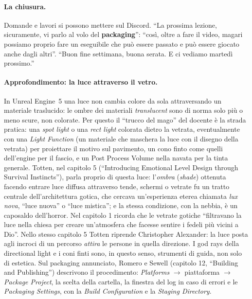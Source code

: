 \paragraph{La chiusura.} Domande e lavori si possono mettere sul Discord. ``La prossima lezione,
sicuramente, vi parlo al volo del \textbf{packaging}'': ``così, oltre a fare il video, magari
possiamo proprio fare un eseguibile che può essere passato e può essere giocato anche dagli
altri''. ``Buon fine settimana, buona serata. E ci vediamo martedì prossimo.''

\paragraph{Approfondimento: la luce attraverso il vetro.} In Unreal Engine~5 una luce non
cambia colore da sola attraversando un materiale traslucido: le ombre dei materiali
\emph{translucent} sono di norma solo più o meno scure, non colorate. Per questo il ``trucco del
mago'' del docente è la strada pratica: una \emph{spot light} o una \emph{rect light} colorata
dietro la vetrata, eventualmente con una \emph{Light Function} (un materiale che maschera la
luce con il disegno della vetrata) per proiettare il motivo sul pavimento, un cono finto come
quelli dell'engine per il fascio, e un Post Process Volume nella navata per la tinta
generale. Totten, nel capitolo 5 (``Introducing Emotional Level Design through Survival
Instincts''), parla proprio di questa luce: l'\emph{ombra} (\emph{shade}) ottenuta facendo
entrare luce diffusa attraverso tende, schermi o vetrate fu un tratto centrale
dell'architettura gotica, che cercava un'esperienza eterea chiamata \emph{lux nova}, ``luce
nuova'' o ``luce mistica''; e la stessa condizione, con la nebbia, è un caposaldo dell'horror.
Nel capitolo 1 ricorda che le vetrate gotiche ``filtravano la luce nella chiesa per creare
un'atmosfera che facesse sentire i fedeli più vicini a Dio''. Nello stesso capitolo 5 Totten
riprende Christopher Alexander: la luce posta agli incroci di un percorso \emph{attira} le
persone in quella direzione. I god rays della directional light e i coni finti sono, in
questo senso, strumenti di guida, non solo di estetica. Sul packaging annunciato, Romero e
Sewell (capitolo 12, ``Building and Publishing'') descrivono il procedimento:
\emph{Platforms} $\rightarrow$ piattaforma $\rightarrow$ \emph{Package Project}, la scelta
della cartella, la finestra del log in caso di errori e le \emph{Packaging Settings}, con la
\emph{Build Configuration} e la \emph{Staging Directory}.

